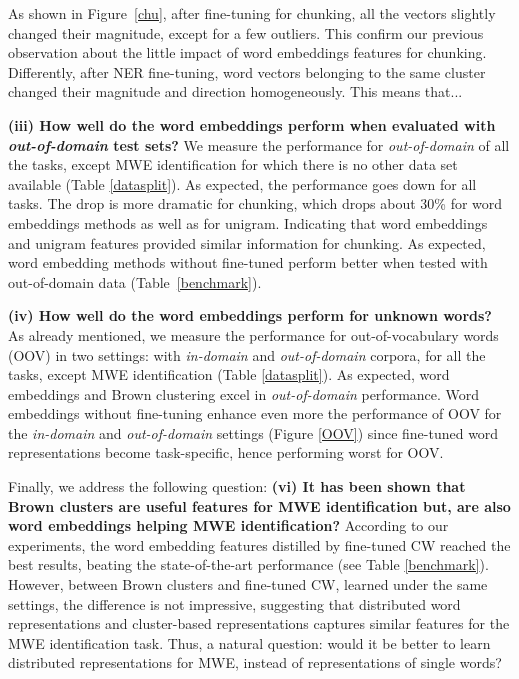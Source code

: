 As shown in Figure~\ref{chu}, after fine-tuning for chunking, all the vectors slightly changed their magnitude, except for a few outliers. This confirm our previous observation about the little impact of word embeddings features for chunking. 
Differently, after NER fine-tuning, word vectors belonging to the same cluster changed their magnitude and direction homogeneously. {\color{red} This means that...}



\textbf{(iii) How well do the word embeddings perform when evaluated with \textit{out-of-domain} test sets?}
We measure the performance for \textit{out-of-domain} of all the tasks, except MWE identification for which there is no other data set available (Table \ref{datasplit}).
As expected, the performance goes down for all tasks. The drop is more dramatic for chunking, which drops about 30\% for word embeddings methods as well as for unigram. 
Indicating that word embeddings and unigram features provided similar information 
for chunking. 
As expected, word embedding methods without fine-tuned perform better when tested with out-of-domain data (Table~\ref{benchmark}). 

\textbf{(iv) How well do the word embeddings perform for unknown words?}
As already mentioned, we measure the performance for out-of-vocabulary words (OOV)
in two settings: with \textit{in-domain} and \textit{out-of-domain} corpora, for all the tasks, except MWE identification (Table \ref{datasplit}).
As expected, word embeddings and Brown clustering excel in \textit{out-of-domain} performance.
Word embeddings without fine-tuning enhance even more the performance of OOV 
for the \textit{in-domain} and \textit{out-of-domain} settings (Figure \ref{OOV}) since fine-tuned
word representations become task-specific, hence performing worst for OOV.


Finally, we address the following question: \textbf{(vi) It has been shown that Brown clusters are useful features for MWE identification but, are also word embeddings helping MWE identification?} 
According to our experiments, the word embedding features distilled by fine-tuned CW reached the best results, beating the state-of-the-art performance (see Table \ref{benchmark}).
However, between Brown clusters and fine-tuned CW, learned under the same settings, the difference is not impressive, suggesting that distributed word representations and cluster-based representations captures similar features for the MWE identification task.
Thus, a natural question: would it be better to learn distributed representations for MWE, instead of representations of single words?



